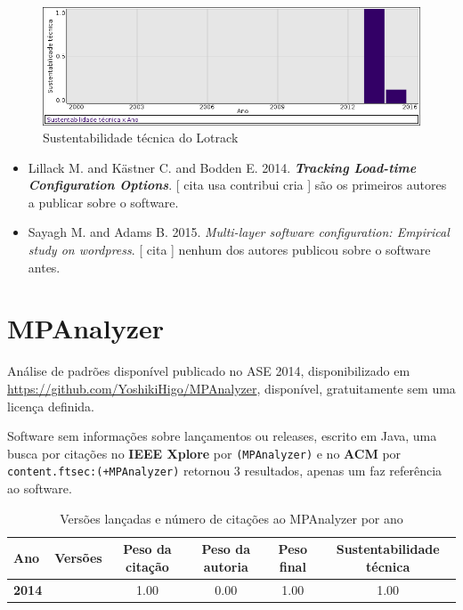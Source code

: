 \begin{figure}[h]
  \center
  \includegraphics[scale=0.50]{result-documents/charts/lotrack.png}
  \caption{Sustentabilidade técnica do Lotrack}
\end{figure}


\begin{itemize}
\item Lillack M. and K\"{a}stner C. and Bodden E.
      2014.
        \textbf{\textit{ Tracking Load-time Configuration Options}}.
      [
          cita
          usa
          contribui
          cria
      ]
são os primeiros autores a publicar sobre o software.
\item Sayagh M. and Adams B.
      2015.
        \textit{ Multi-layer software configuration: Empirical study on wordpress}.
      [
          cita
      ]
nenhum dos autores publicou sobre o software antes.
\end{itemize}
\section{MPAnalyzer}

Análise de padrões disponível
publicado no ASE 2014,
disponibilizado em \url{https://github.com/YoshikiHigo/MPAnalyzer},
disponível,
gratuitamente
sem uma licença definida.

Software sem informações sobre lançamentos ou releases,
escrito em Java,
uma busca por citações no {\bf IEEE Xplore} por
\texttt{(MPAnalyzer)}
e no {\bf ACM} por
\texttt{content.ftsec:(+MPAnalyzer)}
retornou
3 resultados,
apenas um faz referência ao software.


\begin{table}[H]
\caption{Versões lançadas e número de citações ao MPAnalyzer por ano}
\centering
\begin{tabular}{| l | c | c | c | c | c |}
  \hline
  Ano & Versões & Peso da citação & Peso da autoria & Peso final & Sustentabilidade técnica \\
  \hline
            {\bf 2014}
          &
          
          &
          1.00
          &
          0.00
          &
          1.00
          &
            {\color{blue} 1.00}
          \\
\hline
\end{tabular}
\end{table}

